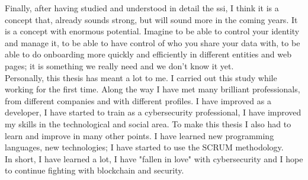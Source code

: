Finally, after having studied and understood in detail the \acrlong{ssi}, I think it is a concept that, already sounds strong, but will sound more in the coming years. It is a concept with enormous potential. Imagine to be able to control your identity and manage it, to be able to have control of who you share your data with, to be able to do onboarding more quickly and efficiently in different entities and web pages; it is something we really need and we don't know it yet.\\

Personally, this thesis has meant a lot to me. I carried out this study while working for the first time. Along the way I have met many brilliant professionals, from different companies and with different profiles. I have improved as a developer, I have started to train as a cybersecurity professional, I have improved my skills in the technological and social area. To make this thesis I also had to learn and improve in many other points. I have learned new programming languages, new technologies; I have started to use the SCRUM methodology.\\

In short, I have learned a lot, I have "fallen in love" with cybersecurity and I hope to continue fighting with blockchain and security.
